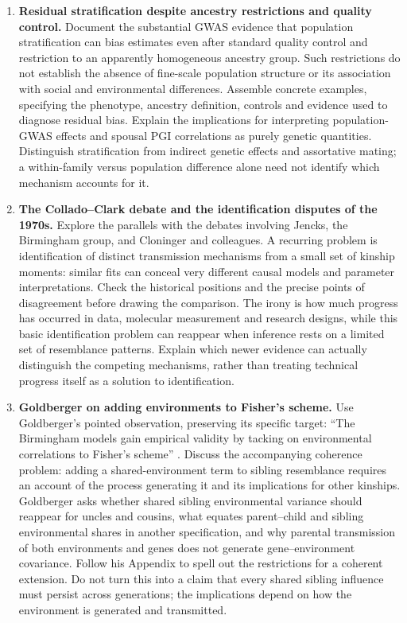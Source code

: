 \documentclass[12pt]{article}
\renewenvironment{itemize}{\begin{enumerate}}{\end{enumerate}}
\begin{document}
\begin{itemize}
\item \textbf{Residual stratification despite ancestry restrictions and quality control.}
Document the substantial GWAS evidence that population stratification
can bias estimates even after standard quality control and restriction
to an apparently homogeneous ancestry group. Such restrictions do not
establish the absence of fine-scale population structure or its
association with social and environmental differences. Assemble concrete
examples, specifying the phenotype, ancestry definition, controls and
evidence used to diagnose residual bias. Explain the implications for
interpreting population-GWAS effects and spousal PGI correlations as
purely genetic quantities. Distinguish stratification from indirect
genetic effects and assortative mating; a within-family versus population
difference alone need not identify which mechanism accounts for it.

\item \textbf{The Collado--Clark debate and the identification disputes of the 1970s.}
Explore the parallels with the debates involving Jencks, the Birmingham
group, and Cloninger and colleagues. A recurring problem is identification
of distinct transmission mechanisms from a small set of kinship moments:
similar fits can conceal very different causal models and parameter
interpretations. Check the historical positions and the precise points
of disagreement before drawing the comparison. The irony is how much
progress has occurred in data, molecular measurement and research designs,
while this basic identification problem can reappear when inference rests
on a limited set of resemblance patterns. Explain which newer evidence
can actually distinguish the competing mechanisms, rather than treating
technical progress itself as a solution to identification.

\item \textbf{Goldberger on adding environments to Fisher's scheme.}
Use Goldberger's pointed observation, preserving its specific target:
``The Birmingham models gain empirical validity by tacking on environmental
correlations to Fisher's scheme'' \citep[p.~36]{Goldberger1978}.
Discuss the accompanying coherence problem: adding a shared-environment
term to sibling resemblance requires an account of the process generating
it and its implications for other kinships. Goldberger asks whether shared
sibling environmental variance should reappear for uncles and cousins,
what equates parent--child and sibling environmental shares in another
specification, and why parental transmission of both environments and genes
does not generate gene--environment covariance. Follow his Appendix to
spell out the restrictions for a coherent extension. Do not turn this into
a claim that every shared sibling influence must persist across generations;
the implications depend on how the environment is generated and transmitted.


\end{itemize}
\end{document}
